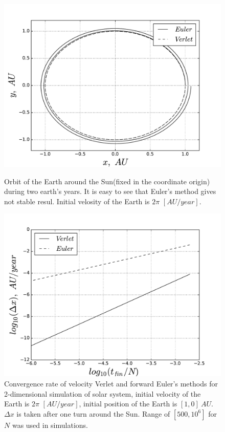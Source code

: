 \documentclass[10pt]{article}
\begin{document}
\newpage
\begin{figure}[ht]
  \begin{center}
    \includegraphics[scale=0.5]{eu_vs_vl}
    \caption {Orbit of the Earth around the Sun(fixed in the coordinate origin) during two earth's years. It is easy to see that Euler's method gives not stable resul. Initial velosity of the Earth is $2\pi$ $[AU/year]$. }
    \label{fig:verlet_vs_euler}
  \end{center}

\vspace*{\floatsep}

  \begin{center}
    \includegraphics[scale=0.5]{c_rate}
    \caption {Convergence rate of velocity Verlet and forward Euler's methods for 2-dimensional simulation of solar system, initial velocity of the Earth is $2\pi$ $[AU/year]$, initial position of the Earth is $[1,0]\ AU$. $\Delta x$ is taken after one turn around the Sun. Range of $[500, 10^6]$ for $N$ was used in simulations. }
    \label{fig:slope}
  \end{center}
\end{figure}
\clearpage
\end{document}
